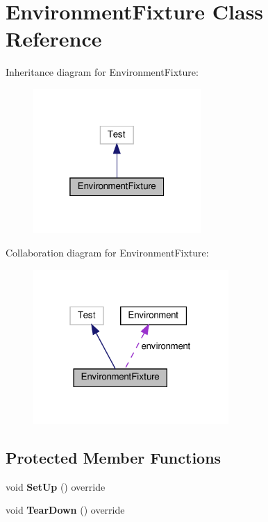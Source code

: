 \hypertarget{classEnvironmentFixture}{}\section{Environment\+Fixture Class Reference}
\label{classEnvironmentFixture}


Inheritance diagram for Environment\+Fixture\+:\nopagebreak
\begin{figure}[H]
\begin{center}
\leavevmode
\includegraphics[width=181pt]{classEnvironmentFixture__inherit__graph}
\end{center}
\end{figure}


Collaboration diagram for Environment\+Fixture\+:\nopagebreak
\begin{figure}[H]
\begin{center}
\leavevmode
\includegraphics[width=211pt]{classEnvironmentFixture__coll__graph}
\end{center}
\end{figure}
\subsection*{Protected Member Functions}
\begin{DoxyCompactItemize}
\item 
\mbox{\label{classEnvironmentFixture_af3b1dfe64133377a8eb5f6cf66e267d7}} 
void {\bfseries Set\+Up} () override
\item 
\mbox{\label{classEnvironmentFixture_ab0a1d67947ac0301920eca471be9358f}} 
void {\bfseries Tear\+Down} () override
\end{DoxyCompactItemize}
